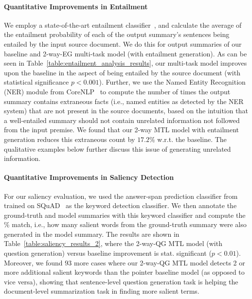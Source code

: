 \documentclass[11pt,a4paper]{article}
\begin{document}
\paragraph{Quantitative Improvements in Entailment}
We employ a state-of-the-art entailment classifier~\cite{chen2017enhanced}, and calculate the average of the entailment probability of each of the output summary's sentences being entailed by the input source document. We do this for output summaries of our baseline and 2-way-EG multi-task model (with entailment generation). As can be seen in Table~\ref{table:entailment_analysis_results}, our multi-task model improves upon the baseline in the aspect of being entailed by the source document (with statistical significance $p<0.001$). Further, we use the Named Entity Recognition (NER) module from CoreNLP~\cite{manning2014corenlp} to compute the number of times the output summary contains extraneous facts (i.e., named entities as detected by the NER system) that are not present in the source documents, based on the intuition that a well-entailed summary should not contain unrelated information not followed from the input premise. We found that our 2-way MTL model with entailment generation reduces this extraneous count by $17.2\%$ w.r.t. the baseline. The qualitative examples below further discuss this issue of generating unrelated information.

\paragraph{Quantitative Improvements in Saliency Detection}
\label{para:saliency-detection}
For our saliency evaluation, we used the answer-span prediction classifier from~\citet{pasunuru2018multi} trained on SQuAD~\cite{rajpurkar2016squad} as the keyword detection classifier. We then annotate the ground-truth and model summaries with this keyword classifier and compute the \% match, i.e., how many salient words from the ground-truth summary were also generated in the model summary. The results are shown in Table~\ref{table:saliency_results_2}, where the 2-way-QG MTL model (with question generation) versus baseline improvement is stat. significant ($p<0.01$).
Moreover, we found $93$ more cases where our 2-way-QG MTL model detects 2 or more additional salient keywords than the pointer baseline model (as opposed to vice versa), showing that sentence-level question generation task is helping the document-level summarization task in finding more salient terms.
\end{document}
